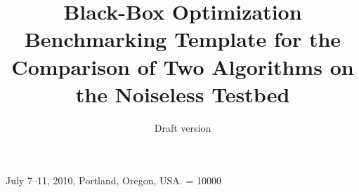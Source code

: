 \documentclass{sig-alternate}
\begin{document}
%
 {July 7--11, 2010, Portland, Oregon, USA.}
\widowpenalty = 10000

\title{Black-Box Optimization Benchmarking Template for the Comparison of Two Algorithms on the Noiseless Testbed}
\subtitle{Draft version
}

%
%
%
%
%
\end{document}

